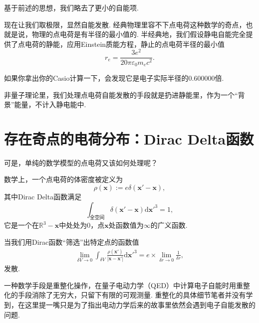 \documentclass[12pt]{article}
\newcommand{\de}[1]{\mathrm{d}#1}
\newcommand{\mbf}[1]{\mathbf{#1}}
\newcommand{\kh}[1]{\left(#1\right)}
\begin{document}
基于前述的思想，我们略去了更小的自能项.

现在让我们取极限，显然自能发散. 经典物理里容不下点电荷这种数学的奇点，也就是说，物理的点电荷是有半径的最小值的. 半经典地，我们假设静电自能完全提供了点电荷的静能，应用Einstein质能方程，静止的点电荷半径的最小值
\[r_e=\frac{3e^2}{20\pi \varepsilon_0m_ec^2}.\]

如果你拿出你的Casio计算一下，会发现它是电子实际半径的\(0.600000\)倍.

非量子理论里，我们处理点电荷自能发散的手段就是扔进静能里，作为一个“背景”能量，不计入静电能中.
\section{存在奇点的电荷分布：Dirac Delta函数}
可是，单纯的数学模型的点电荷又该如何处理呢？

数学上，一个点电荷的体密度被定义为
\[\rho\kh{\mbf x}:=e\delta\kh{\mbf x'-\mbf x},\]
其中Dirac Delta函数满足
\[\int_{\text{全空间}}\delta \kh{\mbf x'-\mbf x}\de {\mbf x'}^3=1,\]
它是一个在\(\mathbb{R}^3-{\mbf x}\)中处处为\(0\)，点\(\mbf x\)处函数值为\(\infty\)的广义函数.

当我们用Dirac函数“筛选”出特定点的函数值
\begin{align*}
    \lim_{\delta V \to 0}\int_{\delta V}\frac{\rho \kh{\mbf x'}}{|\mbf x - \mbf x'|} \de {\mbf x'}^3=e\times\lim_{\delta r\to0}\frac{1}{\delta r},
\end{align*}
发散.

一种数学手段是重整化操作，在量子电动力学（QED）中计算电子自能时用重整化的手段消除了无穷大，只留下有限的可观测量. 重整化的具体细节笔者并没有学到，在这里提一嘴只是为了指出电动力学后来的故事里依然会遇到电子自能发散的问题.
\end{document}

